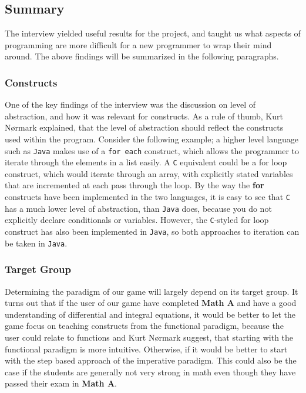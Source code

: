 \subsection{Summary}

The interview yielded useful results for the project, and taught us what aspects of programming are more difficult for a new programmer to wrap their mind around.
The above findings will be summarized in the following paragraphs.

\subsubsection{Constructs}

One of the key findings of the interview was the discussion on level of abstraction, and how it was relevant for constructs.
As a rule of thumb, Kurt N{\o}rmark explained, that the level of abstraction should reflect the constructs used within the program.
Consider the following example; a 
higher level language such as \texttt{Java} makes use of a \verb|for each| construct, which allows the programmer to iterate through the elements in a list easily.
A \texttt{C} equivalent could be a for loop construct, which would iterate through an array, with explicitly stated variables that are incremented at each pass through the loop.
By the way the \textbf{for} constructs have been implemented in the two languages, it is easy to see that \texttt{C} has a much lower level of abstraction, than \texttt{Java} does, because you do not explicitly declare conditionals or variables. 
However, the \texttt{C}-styled for loop construct has also been implemented in \texttt{Java}, so both approaches to iteration can be taken in \texttt{Java}.

\subsubsection{Target Group}

Determining the paradigm of our game will largely depend on its target group.
It turns out that if the user of our game have completed \textbf{Math A} and have a good understanding of differential and integral equations, it would be better to let the game focus on teaching constructs from the functional paradigm, because the user could relate to functions and Kurt N{\o}rmark suggest, that starting with the functional paradigm is more intuitive.
Otherwise, if it would be better to start with the step based approach of the imperative paradigm.
This could also be the case if the students are generally not very strong in math even though they have passed their exam in \textbf{Math A}.

